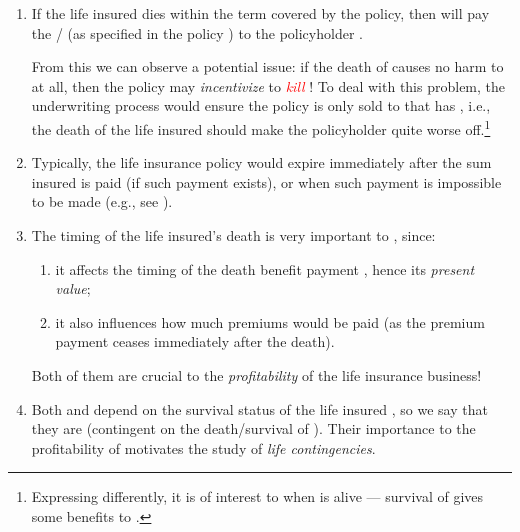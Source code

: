 \begin{enumerate}
\item If the life insured  dies within the term covered by the
policy, then  will pay the /  (as specified in the policy
) to the policyholder .

\begin{note}
From this we can observe a potential issue: if the death of 
causes no harm to  at all, then the policy may \emph{incentivize}
 to \textcolor{red}{\emph{kill}} ! To deal with this
problem, the underwriting process would ensure the policy  is only
sold to  that has , i.e., the death of the
life insured  should make the policyholder  quite worse
off.\footnote{Expressing differently, it is of interest to  when
 is alive --- survival of  gives some benefits to
.}
\end{note}

\item Typically, the life insurance policy would expire immediately after
the sum insured is paid (if such payment exists), or when such payment is
impossible to be made (e.g., see ).

\item The timing of the life insured's death  is very important to
, since:
\begin{enumerate}
\item it affects the timing of the death benefit payment
, hence its \emph{present value};

\item it also influences how much premiums  would be paid
(as the premium payment ceases immediately after the death).
\end{enumerate}
Both of them are crucial to the \emph{profitability}
 of the life insurance business!

\item Both  and  depend on the
survival status of the life insured , so we say that they are
 (contingent on the death/survival of ).
Their importance to the profitability of  motivates the study
of \emph{life contingencies}.
\end{enumerate}


